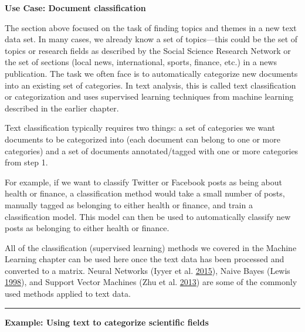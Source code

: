 \documentclass[]{krantz}
\begin{document}
\textbf{Use Case: Document classification}

The section above focused on the task of finding topics and themes in a
new text data set. In many cases, we already know a set of topics---this
could be the set of topics or research fields as described by the Social
Science Research Network or the set of sections (local news,
international, sports, finance, etc.) in a news publication. The task we
often face is to automatically categorize new documents into an existing
set of categories. In text analysis, this is called text classification
or categorization and uses supervised learning techniques from machine
learning described in the earlier chapter.

Text classification typically requires two things: a set of categories
we want documents to be categorized into (each document can belong to
one or more categories) and a set of documents annotated/tagged with one
or more categories from step 1.

For example, if we want to classify Twitter or Facebook posts as being
about health or finance, a classification method would take a small
number of posts, manually tagged as belonging to either health or
finance, and train a classification model. This model can then be used
to automatically classify new posts as belonging to either health or
finance.

All of the classification (supervised learning) methods we covered in
the Machine Learning chapter can be used here once the text data has
been processed and converted to a matrix. Neural Networks (Iyyer et al.
\protect\hyperlink{ref-iyyer-15}{2015}), Naive Bayes (Lewis
\protect\hyperlink{ref-lewis-05}{1998}), and Support Vector Machines
(Zhu et al. \protect\hyperlink{ref-zhu-13}{2013}) are some of the
commonly used methods applied to text data.

\begin{center}\rule{0.5\linewidth}{\linethickness}\end{center}

\textbf{Example: Using text to categorize scientific fields}
\end{document}
